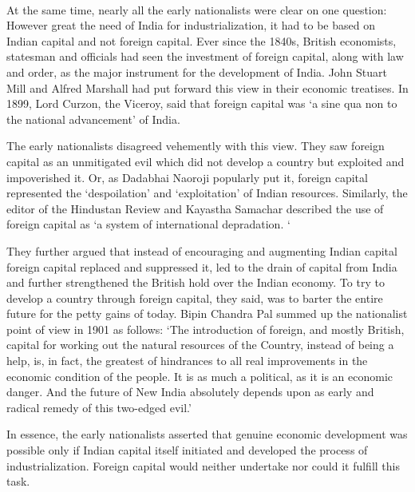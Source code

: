 \begin{multicols}{2}
\paragraph*{}

At the same time, nearly all the early nationalists were clear on one question: However great the need of India for industrialization, it had to be based on Indian capital and not foreign capital. Ever since the 1840s, British economists, statesman and officials had seen the investment of foreign capital, along with law and order, as the major instrument for the development of India. John Stuart Mill and Alfred Marshall had put forward this view in their economic treatises. In 1899, Lord Curzon, the Viceroy, said that foreign capital was `a sine qua non to the national advancement' of India.

The early nationalists disagreed vehemently with this view. They saw foreign capital as an unmitigated evil which did not develop a country but exploited and impoverished it. Or, as Dadabhai Naoroji popularly put it, foreign capital represented the `despoilation' and `exploitation' of Indian resources. Similarly, the editor of the Hindustan Review and Kayastha Samachar described the use of foreign capital as `a system of international depradation. `

They further argued that instead of encouraging and augmenting Indian capital foreign capital replaced and suppressed it, led to the drain of capital from India and further strengthened the British hold over the Indian economy. To try to develop a country through foreign capital, they said, was to barter the entire future for the petty gains of today. Bipin Chandra Pal summed up the nationalist point of view in 1901 as follows: `The introduction of foreign, and mostly British, capital for working out the natural resources of the Country, instead of being a help, is, in fact, the greatest of hindrances to all real improvements in the economic condition of the people. It is as much a political, as it is an economic danger. And the future of New India absolutely depends upon as early and radical remedy of this two-edged evil.'

In essence, the early nationalists asserted that genuine economic development was possible only if Indian capital itself initiated and developed the process of industrialization. Foreign capital would neither undertake nor could it fulfill this task.


\end{multicols}
